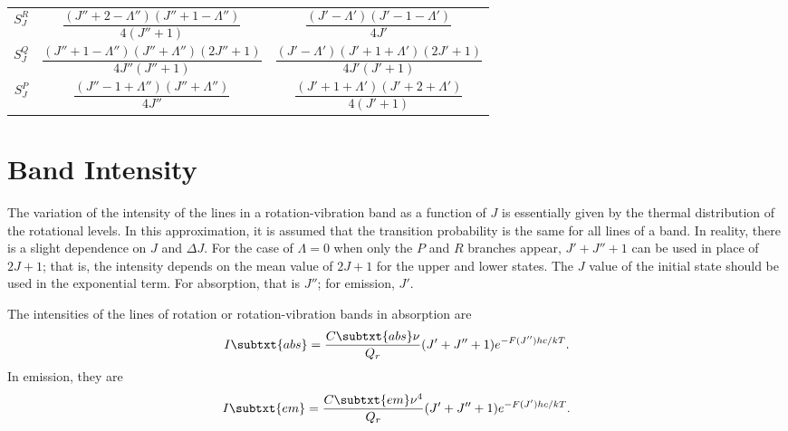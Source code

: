\begin{table}[H]
\begin{tabular}{ccc}
        $S_{J}^{R}$ & $\dfrac{(J'' + 2 - \Lambda'')(J'' + 1 - \Lambda'')}{4(J'' + 1)}$          & $\dfrac{(J' - \Lambda')(J' - 1 - \Lambda')}{4J'}$                  \\
        \addlinespace[0.5em]
        $S_{J}^{Q}$ & $\dfrac{(J'' + 1 - \Lambda'')(J'' + \Lambda'')(2J'' + 1)}{4J''(J'' + 1)}$ & $\dfrac{(J' - \Lambda')(J' + 1 + \Lambda')(2J' + 1)}{4J'(J' + 1)}$ \\
        \addlinespace[0.5em]
        $S_{J}^{P}$ & $\dfrac{(J'' - 1 + \Lambda'')(J'' + \Lambda'')}{4J''}$                    & $\dfrac{(J' + 1 + \Lambda')(J' + 2 + \Lambda')}{4(J' + 1)}$        \\
        \bottomrule
    \end{tabular}
\end{table}

\section{Band Intensity}
\label{s:band_intensity}

The variation of the intensity of the lines in a rotation-vibration band as a function of $J$ is essentially given by the thermal distribution of the rotational levels. In this approximation, it is assumed that the transition probability is the same for all lines of a band. In reality, there is a slight dependence on $J$ and $\Delta{}J$. For the case of $\Lambda = 0$ when only the $P$ and $R$ branches appear, $J' + J'' + 1$ can be used in place of $2J + 1$; that is, the intensity depends on the mean value of $2J + 1$ for the upper and lower states. The $J$ value of the initial state should be used in the exponential term. For absorption, that is $J''$; for emission, $J'$.

The intensities of the lines of rotation or rotation-vibration bands in absorption are
\begin{equation}
    I\subtxt{abs} = \frac{C\subtxt{abs}\nu}{Q_{r}}(J' + J'' + 1)e^{-F(J'')hc/kT}.
\end{equation}
In emission, they are
\begin{equation}
    I\subtxt{em} = \frac{C\subtxt{em}\nu^{4}}{Q_{r}}(J' + J'' + 1)e^{-F(J')hc/kT}.
\end{equation}
